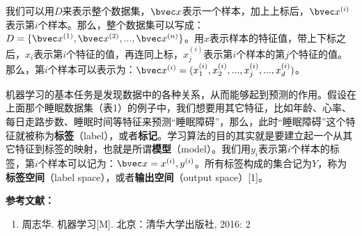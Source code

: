 我们可以用$D$来表示整个数据集，$\bvec x$表示一个样本，加上上标后，$\bvec x^{(i)}$表示第$i$个样本。那么，整个数据集可以写成：$D=\{\bvec x^{(1)}, \bvec x^{(2)}, ..., \bvec x^{(n)}\}$。用$x$表示样本的特征值，带上下标之后，$x_i$表示第$i$个特征的值，再连同上标，$x^{(i)}_j$表示第$i$个样本的第$j$个特征的值。那么，第$i$个样本可以表示为：$\bvec x^{(i)}=(x^{(i)}_1, x^{(i)}_2, ..., x^{(i)}_j, ..., x^{(i)}_d)$。

机器学习的基本任务是发现数据中的各种关系，从而能够起到预测的作用。假设在上面那个睡眠数据集（表1）的例子中，我们想要用其它特征，比如年龄、心率、每日走路步数、睡眠时间等特征来预测“睡眠障碍”，那么，此时“睡眠障碍”这个特征就被称为\textbf{标签}（label），或者\textbf{标记}。学习算法的目的其实就是要建立起一个从其它特征到标签的映射，也就是所谓\textbf{模型}（model）。我们用$y_i$表示第$i$个样本的标签，第$i$个样本可以记为：$\bvec x=x^{(i)}, y^{(i)}$。所有标签构成的集合记为$Y$，称为\textbf{标签空间}（label space），或者\textbf{输出空间}（output space）[1]。


\textbf{参考文献：}
\begin{enumerate}
\item 周志华. 机器学习[M]. 北京：清华大学出版社, 2016: 2
\end{enumerate}
